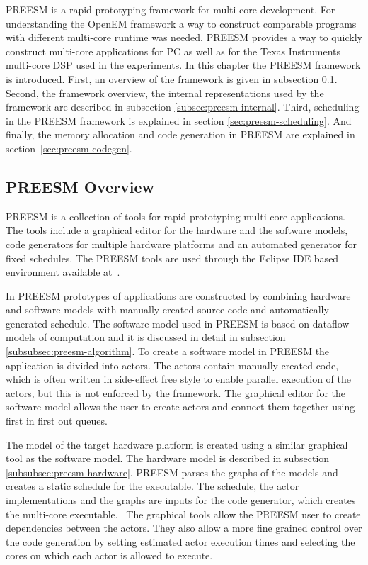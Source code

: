 PREESM is a rapid prototyping framework for multi-core development. For understanding the OpenEM framework a way to construct comparable programs with different multi-core runtime was needed. PREESM provides a way to quickly construct multi-core applications for PC as well as for the Texas Instruments multi-core DSP used in the experiments. In this chapter the PREESM framework is introduced. First, an overview of the framework is given in subsection \ref{subsec:preesm-overview}. Second, the framework overview, the internal representations used by the framework are described in subsection \ref{subsec:preesm-internal}. Third, scheduling in the PREESM framework is explained in section \ref{sec:preesm-scheduling}. And finally, the memory allocation and code generation in PREESM are explained in section~\ref{sec:preesm-codegen}.

\subsection{PREESM Overview}
\label{subsec:preesm-overview}
PREESM is a collection of tools for rapid prototyping multi-core applications. The tools include a graphical editor for the hardware and the software models, code generators for multiple hardware platforms and an automated generator for fixed schedules. The PREESM tools are used through the Eclipse IDE based environment available at~\cite{preesm}.

In PREESM prototypes of applications are constructed by combining hardware and software models with manually created source code and automatically generated schedule. The software model used in PREESM is based on dataflow models of computation and it is discussed in detail in subsection \ref{subsubsec:preesm-algorithm}. To create a software model in PREESM the application is divided into actors. The actors contain manually created code, which is often written in side-effect free style to enable parallel execution of the actors, but this is not enforced by the framework. The graphical editor for the software model allows the user to create actors and connect them together using first in first out queues.~\cite{preesm}

The model of the target hardware platform is created using a similar graphical tool as the software model. The hardware model is described in subsection \ref{subsubsec:preesm-hardware}. PREESM parses the graphs of the models and creates a static schedule for the executable. The schedule, the actor implementations and the graphs are inputs for the code generator, which creates the multi-core executable.~\cite{pelcat2014preesm} The graphical tools allow the PREESM user to create dependencies between the actors. They also allow a more fine grained control over the code generation by setting estimated actor execution times and selecting the cores on which each actor is allowed to execute.

